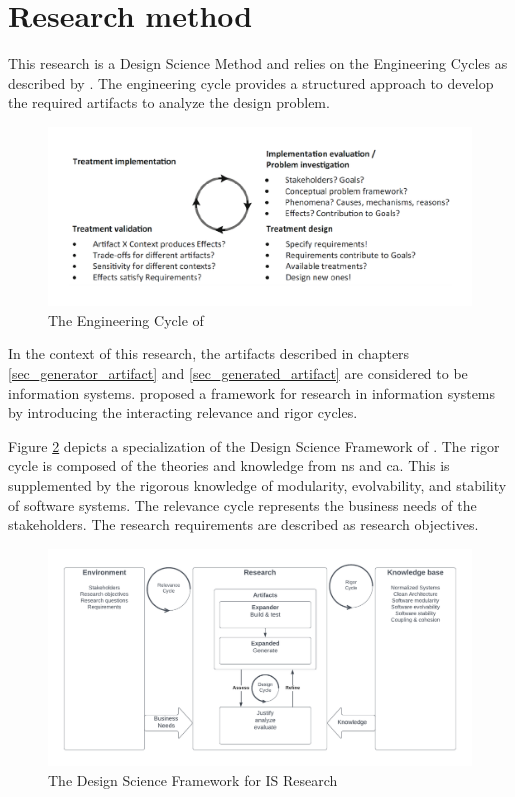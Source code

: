 \section{Research method} \label{sec_research_method}

This research is a Design Science Method and relies on the Engineering Cycles as described
by \textcite{wieringa_design_2014}. The engineering cycle provides a structured approach
to develop the required artifacts to analyze the design problem.

\begin{figure}[H]
    \centering
    \includegraphics[width=1\textwidth]{Figures/engineering_cycle.pdf}
    \caption[Engineering cycle]{The Engineering Cycle of \textcite{wieringa_design_2014}}
    \label{fig_engineering_cycle}
\end{figure}

In the context of this research, the artifacts described in chapters
\ref{sec_generator_artifact} and \ref{sec_generated_artifact} are considered to be
information systems. \citeauthor{hevner_design_2004} proposed a framework for research
in information systems by introducing the interacting relevance and rigor cycles.

Figure \ref{fig_dsr} depicts a specialization of the Design Science Framework of
\textcite{hevner_design_2004}. The rigor cycle is composed of the theories and knowledge
from \gls{ns} and \gls{ca}. This is supplemented by the rigorous knowledge of modularity,
evolvability, and stability of software systems. The relevance cycle represents the
business needs of the stakeholders. The research requirements are described as research
objectives.

\begin{figure}[H]
    \centering
    \includegraphics[width=1\textwidth]{Figures/rigor_relevance_cycle.pdf}
    \caption[Design Science Framework for IS Research]{The Design Science Framework for IS Research}
    \label{fig_dsr}
\end{figure}